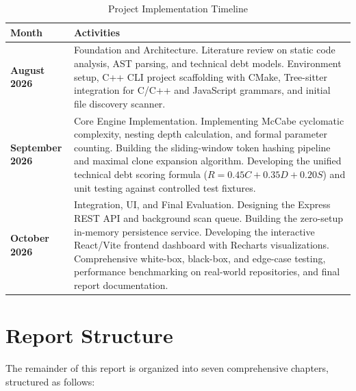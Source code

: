 \begin{table}[H]
\centering
\caption{Project Implementation Timeline}
\label{tab:timeline}
\vspace{0.2cm}
\begin{tabular}{lp{11.5cm}}
\toprule
\textbf{Month} & \textbf{Activities} \\
\midrule
\textbf{August 2026} & Foundation and Architecture. Literature review on static code analysis, AST parsing, and technical debt models. Environment setup, C++ CLI project scaffolding with CMake, Tree-sitter integration for C/C++ and JavaScript grammars, and initial file discovery scanner. \\
\addlinespace
\textbf{September 2026} & Core Engine Implementation. Implementing McCabe cyclomatic complexity, nesting depth calculation, and formal parameter counting. Building the sliding-window token hashing pipeline and maximal clone expansion algorithm. Developing the unified technical debt scoring formula ($R = 0.45C + 0.35D + 0.20S$) and unit testing against controlled test fixtures. \\
\addlinespace
\textbf{October 2026} & Integration, UI, and Final Evaluation. Designing the Express REST API and background scan queue. Building the zero-setup in-memory persistence service. Developing the interactive React/Vite frontend dashboard with Recharts visualizations. Comprehensive white-box, black-box, and edge-case testing, performance benchmarking on real-world repositories, and final report documentation. \\
\bottomrule
\end{tabular}
\end{table}


\clearpage
\section{Report Structure}
The remainder of this report is organized into seven comprehensive chapters, structured as follows:

